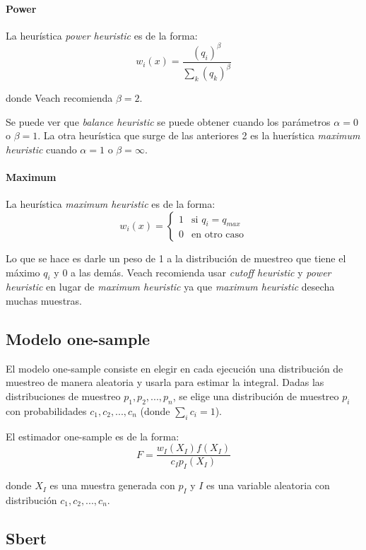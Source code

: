 \documentclass{article}
\begin{document}
\paragraph{Power} La heurística \textit{power heuristic} es de la forma:
$$ w_{i}(x) = \frac{(q_{i})^{\beta}}{\sum_{k} (q_{k})^{\beta}}$$

donde Veach recomienda $\beta = 2$.

Se puede ver que \textit{balance heuristic} se puede obtener cuando los parámetros $\alpha = 0$ o $\beta = 1$.
La otra heurística que surge de las anteriores 2 es la huerística \textit{maximum heuristic} cuando $\alpha = 1$ o $\beta = \infty$.

\paragraph{Maximum} La heurística \textit{maximum heuristic} es de la forma:
$$ w_{i}(x) = \begin{cases} 1 & \text{si } q_{i} = q_{max} \\ 0 & \text{en otro caso} \end{cases}$$

Lo que se hace es darle un peso de 1 a la distribución de muestreo que tiene el máximo $q_{i}$ y 0 a las demás.
Veach recomienda usar \textit{cutoff heuristic} y \textit{power heuristic} en lugar de \textit{maximum heuristic} ya que \textit{maximum heuristic} desecha muchas muestras.

\subsection{Modelo one-sample}

El modelo one-sample consiste en elegir en cada ejecución una distribución de muestreo de manera aleatoria y usarla para estimar la integral.
Dadas las distribuciones de muestreo $p_{1}, p_{2}, ..., p_{n}$, se elige una distribución de muestreo $p_{i}$ con probabilidades $c_{1}, c_{2}, ..., c_{n}$ (donde $\sum_{i} c_{i} = 1$).

El estimador one-sample es de la forma:
$$F = \frac{w_{I}(X_{I}) f(X_{I})}{c_{I} p_{I}(X_{I})}$$

donde $X_{I}$ es una muestra generada con $p_{I}$ y $I$ es una variable aleatoria con distribución $c_{1}, c_{2}, ..., c_{n}$.

\subsection{Sbert}
\end{document}

